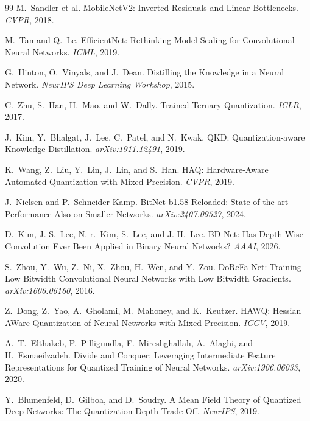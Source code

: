 \begin{thebibliography}{99}
M.~Sandler et al.
\newblock MobileNetV2: Inverted Residuals and Linear Bottlenecks.
\newblock \emph{CVPR}, 2018.

M.~Tan and Q.~Le.
\newblock EfficientNet: Rethinking Model Scaling for Convolutional Neural Networks.
\newblock \emph{ICML}, 2019.

G.~Hinton, O.~Vinyals, and J.~Dean.
\newblock Distilling the Knowledge in a Neural Network.
\newblock \emph{NeurIPS Deep Learning Workshop}, 2015.

C.~Zhu, S.~Han, H.~Mao, and W.~Dally.
\newblock Trained Ternary Quantization.
\newblock \emph{ICLR}, 2017.

J.~Kim, Y.~Bhalgat, J.~Lee, C.~Patel, and N.~Kwak.
\newblock QKD: Quantization-aware Knowledge Distillation.
\newblock \emph{arXiv:1911.12491}, 2019.

K.~Wang, Z.~Liu, Y.~Lin, J.~Lin, and S.~Han.
\newblock HAQ: Hardware-Aware Automated Quantization with Mixed Precision.
\newblock \emph{CVPR}, 2019.

J.~Nielsen and P.~Schneider-Kamp.
\newblock BitNet b1.58 Reloaded: State-of-the-art Performance Also on Smaller Networks.
\newblock \emph{arXiv:2407.09527}, 2024.

D.~Kim, J.-S.~Lee, N.-r.~Kim, S.~Lee, and J.-H.~Lee.
\newblock BD-Net: Has Depth-Wise Convolution Ever Been Applied in Binary Neural Networks?
\newblock \emph{AAAI}, 2026.

S.~Zhou, Y.~Wu, Z.~Ni, X.~Zhou, H.~Wen, and Y.~Zou.
\newblock DoReFa-Net: Training Low Bitwidth Convolutional Neural Networks with Low Bitwidth Gradients.
\newblock \emph{arXiv:1606.06160}, 2016.

Z.~Dong, Z.~Yao, A.~Gholami, M.~Mahoney, and K.~Keutzer.
\newblock HAWQ: Hessian AWare Quantization of Neural Networks with Mixed-Precision.
\newblock \emph{ICCV}, 2019.

A.~T.~Elthakeb, P.~Pilligundla, F.~Mireshghallah, A.~Alaghi, and H.~Esmaeilzadeh.
\newblock Divide and Conquer: Leveraging Intermediate Feature Representations for Quantized Training of Neural Networks.
\newblock \emph{arXiv:1906.06033}, 2020.

Y.~Blumenfeld, D.~Gilboa, and D.~Soudry.
\newblock A Mean Field Theory of Quantized Deep Networks: The Quantization-Depth Trade-Off.
\newblock \emph{NeurIPS}, 2019.


\end{thebibliography}
